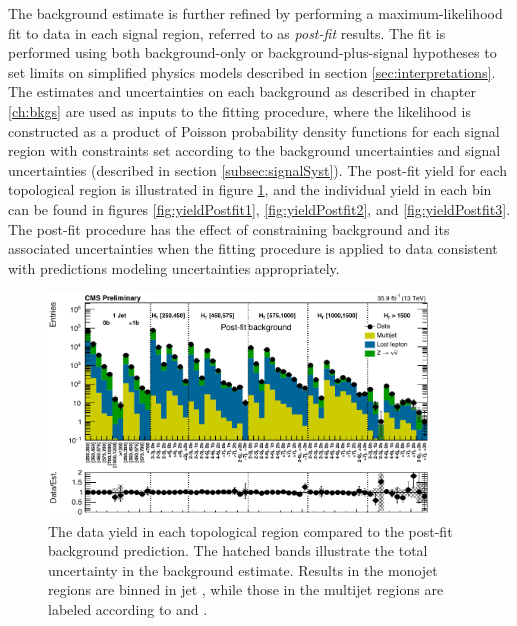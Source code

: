 The background estimate is further refined by performing a maximum-likelihood fit to data in each signal region, referred to as {\it post-fit} results. The fit is performed using both background-only or background-plus-signal hypotheses to set limits on simplified physics models described in section \ref{sec:interpretations}. The estimates and uncertainties on each background as described in chapter \ref{ch:bkgs} are  used as inputs to the fitting procedure, where the likelihood is constructed as a product of Poisson probability density functions for each signal region with constraints set according to the background uncertainties and signal uncertainties (described in section \ref{subsec:signalSyst}). The post-fit yield for each topological region is illustrated in figure \ref{fig:yieldPostfitTopological}, and the individual yield in each \mttwo bin can be found in figures \ref{fig:yieldPostfit1}, \ref{fig:yieldPostfit2}, and \ref{fig:yieldPostfit3}. The post-fit procedure has the effect of constraining background and its associated uncertainties when the fitting procedure is applied to data consistent with predictions modeling uncertainties appropriately.
\begin{figure}
	\centering
	\includegraphics[width=0.90\textwidth]{results/figs/postfit/mt2_ALL_fullEstimate}
	\renewcommand{\baselinestretch}{1.0}
	\caption[The data yield in each topological region compared to the post-fit background prediction.]{The data yield in each topological region compared to the post-fit background prediction. The hatched bands illustrate the total uncertainty in the background estimate. Results in the monojet regions are binned in jet \pt, while those in the multijet regions are labeled according to \nj and \nb.}
	\label{fig:yieldPostfitTopological}
\end{figure}
